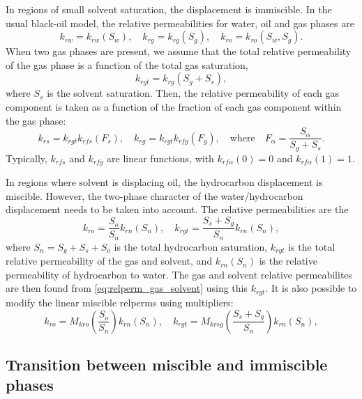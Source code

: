 \documentclass[11pt, a4paper]{article}
\begin{document}
In regions of small solvent saturation, the displacement is immiscible. In the usual black-oil
model, the relative permeabilities for water, oil and gas phases are
\begin{equation*}
  k_{rw} = k_{rw}(S_w), \quad k_{rg} = k_{rg}(S_g), \quad k_{ro} = k_{ro}(S_w, S_g).
\end{equation*}
When two gas phases are present, we assume that the total relative permeability of the gas phase is
a function of the total gas saturation,
\begin{equation*}
  k_{rgt} = k_{rg}(S_g + S_s),
\end{equation*}
where $S_s$ is the solvent saturation. Then, the relative permeability of each gas component is
taken as a function of the fraction of each gas component within the gas phase:
\begin{equation}
  \label{eq:relperm_gas_solvent}
  k_{rs} = k_{rgt}k_{rfs}(F_s), \quad k_{rg} = k_{rgt}k_{rfg}(F_g), \quad \text{where}
  \quad F_\alpha = \frac{S_\alpha}{S_g + S_s}.
\end{equation}
Typically, $k_{rfs}$ and $k_{rfg}$ are linear functions, with $k_{rf\alpha}(0) = 0$ and $k_{rf\alpha}(1) = 1$.

In regions where solvent is displacing oil, the hydrocarbon displacement is
miscible. However, the two-phase character of the water/hydrocarbon displacement
needs to be taken into account. The relative permeabilities are the
\begin{equation}
  \label{eq:miscible_relperms}
  k_{ro} = \frac{S_o}{S_n}k_{rn}(S_n), \quad k_{rgt} = \frac{S_s + S_g}{S_n}k_{rn}(S_n),
\end{equation}
where $S_n = S_g + S_s + S_o$ is the total hydrocarbon saturation, $k_{rgt}$ is the total relative
permeability of the gas and solvent, and $k_{rn}(S_n)$ is the relative permeability of hydrocarbon
to water. The gas and solvent relative permeabilites are then found from
\eqref{eq:relperm_gas_solvent} using this $k_{rgt}$. It is also possible to modify the linear
miscible relperms using multipliers:
\begin{equation*}
  k_{ro} = M_{kro}\left(\frac{S_o}{S_n}\right)k_{rn}(S_n), \quad k_{rgt} = M_{krsg}\left(\frac{S_s + S_g}{S_n}\right)k_{rn}(S_n),
\end{equation*}

\subsection*{Transition between miscible and immiscible phases}
\end{document}

